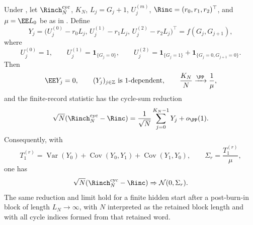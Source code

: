 \begin{lemma}\label{lem:three-inclusion-clt-reduction-main}
Under , let
\(\Rinch_N^{\mathrm{cyc}}\), \(K_N\), \(L_j=G_j+1\), \(U_j^{(m)}\),
\(\Rinc=(r_0,r_1,r_2)^\top\), and \(\mu=\EE L_0\) be as in
.  Define
\[
Y_j=
\bigl(U_j^{(0)}-r_0L_j,\,
U_j^{(1)}-r_1L_j,\,
U_j^{(2)}-r_2L_j\bigr)^\top
=f(G_j,G_{j+1}),
\]
where
\[
U_j^{(0)}=1,\qquad
U_j^{(1)}=\mathbf1_{\{G_j=0\}},\qquad
U_j^{(2)}
=\mathbf1_{\{G_j=1\}}+\mathbf1_{\{G_j=0,G_{j+1}=0\}} .
\]
Then
\[
\EE Y_j=0,\qquad (Y_j)_{j\in\mathbb Z}\ \text{is \(1\)-dependent},
\qquad
\frac{K_N}{N}\xrightarrow{\PP}\frac1\mu,
\]
and the finite-record statistic has the cycle-sum reduction
\begin{equation}\label{eq:three-inclusion-clt-reduction-main}
\sqrt N(\Rinch_N^{\mathrm{cyc}}-\Rinc)
=
\frac1{\sqrt N}\sum_{j=0}^{K_N-1}Y_j+o_{\PP}(1).
\end{equation}
Consequently, with
\[
T_1^{(r)}
=\operatorname{Var}(Y_0)+\operatorname{Cov}(Y_0,Y_1)
 +\operatorname{Cov}(Y_1,Y_0),
\qquad
\Sigma_r=\frac{T_1^{(r)}}{\mu},
\]
one has
\[
\sqrt N(\Rinch_N^{\mathrm{cyc}}-\Rinc)
\Rightarrow \mathcal N(0,\Sigma_r).
\]
The same reduction and limit hold for a finite hidden start after a
post-burn-in block of length \(L_N\to\infty\), with \(N\) interpreted as the
retained block length and with all cycle indices formed from that retained
word.
\end{lemma}

